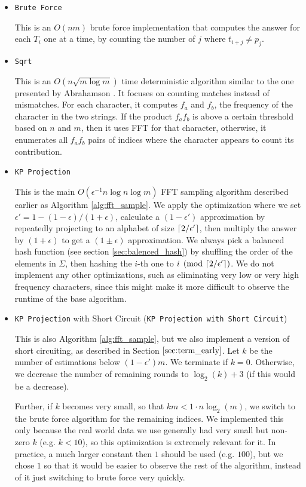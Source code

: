 \documentclass{article}
\theoremstyle{definition}
\newcommand{\eps}{\epsilon}
\DeclarePairedDelimiter{\ceil}{\lceil}{\rceil}
\begin{document}
\begin{itemize}
    \item \texttt{Brute Force}

    This is an $O(nm)$ brute force implementation that computes the answer for each $T_i$ one at a time, by counting the number of $j$ where $t_{i+j} \neq p_j$.

    \item \texttt{Sqrt}

    This is an $O(n \sqrt{m \log m})$ time deterministic algorithm similar to the one presented by Abrahamson \cite{abrahamson87}.
    It focuses on counting matches instead of mismatches.
    For each character, it computes $f_a$ and $f_b$, the frequency of the character in the two strings.
    If the product $f_af_b$ is above a certain threshold based on $n$ and $m$, then it uses FFT for that character, otherwise, it enumerates all $f_af_b$ pairs of indices where the character appears to count its contribution.
    
    \item \texttt{KP Projection}

    This is the main $O(\eps^{-1} n \log n \log m)$ FFT sampling algorithm described earlier as Algorithm \ref{alg:fft_sample}.
    We apply the optimization where we set $\eps' = 1 - (1 - \eps)/(1 + \eps)$, calculate a $(1 - \eps')$ approximation by repeatedly projecting to an alphabet of size $\ceil{2/\eps'}$, then multiply the answer by $(1 + \eps)$ to get a $(1 \pm \eps)$ approximation.
    We always pick a balanced hash function (see section \ref{sec:balenced_hash}) by shuffling the order of the elements in $\Sigma$, then hashing the $i$-th one to $i \pmod {\ceil{2/\eps'}}$.
    We do not implement any other optimizations, such as eliminating very low or very high frequency characters, since this might make it more difficult to observe the runtime of the base algorithm.

    \item \texttt{KP Projection} with Short Circuit (\texttt{KP Projection with Short Circuit})

    This is also Algorithm \ref{alg:fft_sample}, but we also implement a version of short circuiting, as described in Section $\ref{sec:term_early}$.
    Let $k$ be the number of estimations below $(1 - \eps')m$.
    We terminate if $k = 0$.
    Otherwise, we decrease the number of remaining rounds to $\log_2(k) + 3$ (if this would be a decrease).

    Further, if $k$ becomes very small, so that $km < 1 \cdot n \log_2(m)$, we switch to the brute force algorithm for the remaining indices.
    We implemented this only because the real world data we use generally had very small but non-zero $k$ (e.g. $k < 10$), so this optimization is extremely relevant for it.
    In practice, a much larger constant then $1$ should be used (e.g. $100$), but we chose $1$ so that it would be easier to observe the rest of the algorithm, instead of it just switching to brute force very quickly.


\end{itemize}
\end{document}
